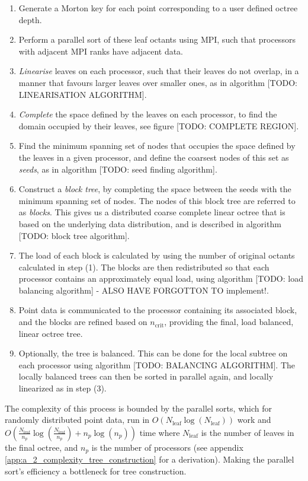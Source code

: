 \begin{enumerate}
    \item Generate a Morton key for each point corresponding to a user defined octree depth.
    \item Perform a parallel sort of these leaf octants using MPI, such that processors with adjacent MPI ranks have adjacent data.
    \item \textit{Linearise} leaves on each processor, such that their leaves do not overlap, in a manner that favours larger leaves over smaller ones, as in algorithm [TODO: LINEARISATION ALGORITHM].
    \item \textit{Complete} the space defined by the leaves on each processor, to find the domain occupied by their leaves, see figure [TODO: COMPLETE REGION].
    \item Find the minimum spanning set of nodes that occupies the space defined by the leaves in a given processor, and define the coarsest nodes of this set as \textit{seeds}, as in algorithm [TODO: seed finding algorithm].
    \item Construct a \textit{block tree}, by completing the space between the seeds with the minimum spanning set of nodes. The nodes of this block tree are referred to as \textit{blocks}. This gives us a distributed coarse complete linear octree that is based on the underlying data distribution, and is described in algorithm [TODO: block tree algorithm].
    \item The load of each block is calculated by using the number of original octants calculated in step (1). The blocks are then redistributed so that each processor contains an approximately equal load, using algorithm [TODO: load balancing algorithm] - ALSO HAVE FORGOTTON TO implement!.
    \item Point data is communicated to the processor containing its associated block, and the blocks are refined based on $n_{\text{crit}}$, providing the final, load balanced, linear octree tree.
    \item Optionally, the tree is balanced. This can be done for the local subtree on each processor using algorithm [TODO: BALANCING ALGORITHM]. The locally balanced trees can then be sorted in parallel again, and locally linearized as in step (3).
\end{enumerate}

The complexity of this process is bounded by the parallel sorts, which for randomly distributed point data, run in $O(N_{\text{leaf}} \log (N_{\text{leaf}}))$ work and $O(\frac{N_{\text{leaf}}}{n_p} \log(\frac{N_{\text{leaf}}}{n_p}) + n_p \log (n_p))$ time where $N_{\text{leaf}}$ is the number of leaves in the final octree, and $n_p$ is the number of processors (see appendix \ref{app:a_2_complexity_tree_construction} for a derivation). Making the parallel sort's efficiency a bottleneck for tree construction.

